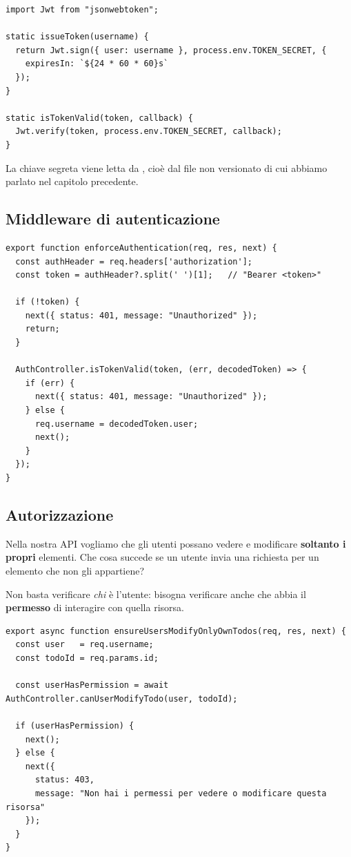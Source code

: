 \begin{lstlisting}[style=js, name=controllers/AuthController.js]
import Jwt from "jsonwebtoken";

static issueToken(username) {
  return Jwt.sign({ user: username }, process.env.TOKEN_SECRET, {
    expiresIn: `${24 * 60 * 60}s`
  });
}

static isTokenValid(token, callback) {
  Jwt.verify(token, process.env.TOKEN_SECRET, callback);
}
\end{lstlisting}

La chiave segreta viene letta da , cioè dal file 
non versionato di cui abbiamo parlato nel capitolo precedente.

\subsection{Middleware di autenticazione}

\begin{lstlisting}[style=js, name=middleware/auth.js]
export function enforceAuthentication(req, res, next) {
  const authHeader = req.headers['authorization'];
  const token = authHeader?.split(' ')[1];   // "Bearer <token>"

  if (!token) {
    next({ status: 401, message: "Unauthorized" });
    return;
  }

  AuthController.isTokenValid(token, (err, decodedToken) => {
    if (err) {
      next({ status: 401, message: "Unauthorized" });
    } else {
      req.username = decodedToken.user;
      next();
    }
  });
}
\end{lstlisting}

\subsection{Autorizzazione}

Nella nostra API vogliamo che gli utenti possano vedere e modificare
\textbf{soltanto i propri} elementi. Che cosa succede se un utente invia una
richiesta  per un elemento che non gli appartiene?

Non basta verificare \textit{chi} è l'utente: bisogna verificare anche che abbia
il \textbf{permesso} di interagire con quella risorsa.

\begin{lstlisting}[style=js, name=middleware/authz.js]
export async function ensureUsersModifyOnlyOwnTodos(req, res, next) {
  const user   = req.username;
  const todoId = req.params.id;

  const userHasPermission = await AuthController.canUserModifyTodo(user, todoId);

  if (userHasPermission) {
    next();
  } else {
    next({
      status: 403,
      message: "Non hai i permessi per vedere o modificare questa risorsa"
    });
  }
}
\end{lstlisting}

